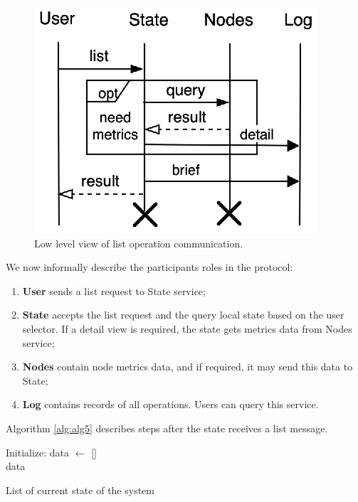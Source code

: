 \begin{figure}[!htbp]
	\begin{center}
		\includegraphics[scale=0.9]{images/FIG4}
	\end{center}
	\vspace{-1.2cm}
	\caption{Low level view of list operation communication.}
	\label{fig:fig8}
\end{figure}

We now informally describe the participants roles in the protocol:\label{list_protocol_informal_description}

\begin{enumerate}[start=1,label={(\bfseries \arabic*)}]
	\item \textbf{User} sends a list request to State service;
	\item \textbf{State} accepts the list request and the query local state based on the user selector. If a detail view is required, the state gets metrics data from Nodes service;
	\item \textbf{Nodes} contain node metrics data, and if required, it may send this data to State;
	\item \textbf{Log} contains records of all operations. Users can query this service.
\end{enumerate}

Algorithm \ref{alg:alg5} describes steps after the state receives a list message.

\begin{algorithm}[H]
	\SetAlgoLined
	Initialize: data $\leftarrow$ []\\
	\Return data
	\caption{List of current state of the system}
	\label{alg:alg5}
\end{algorithm}

